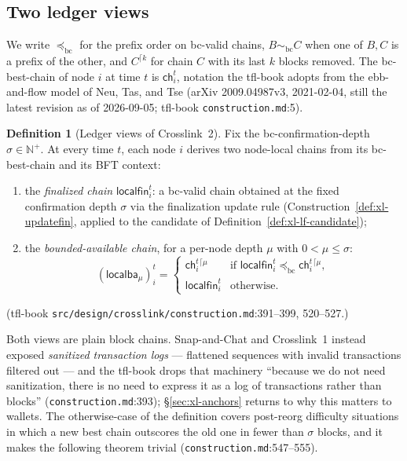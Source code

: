 \documentclass[11pt,a4paper]{article}
\theoremstyle{definition}
\newtheorem{definition}[theorem]{Definition}
\newcommand{\N}{\mathbb{N}}
\begin{document}
\subsection{Two ledger views}\label{sec:xl-views}

We write $\preceq_{\mathrm{bc}}$ for the prefix order on bc-valid chains,
$B \sim_{\mathrm{bc}} C$ when one of $B, C$ is a prefix of the other, and
$C^{\lceil k}$ for chain $C$ with its last $k$ blocks removed. The
bc-best-chain of node $i$ at time $t$ is $\mathsf{ch}_i^t$, notation the
tfl-book adopts from the ebb-and-flow model of Neu, Tas, and Tse (arXiv
2009.04987v3, 2021-02-04, still the latest revision as of 2026-09-05;
tfl-book \texttt{construction.md}:5).

\begin{definition}[Ledger views of Crosslink~2]\label{def:xl-ledger-views}
Fix the bc-confirmation-depth $\sigma \in \N^{+}$. At every time $t$, each
node $i$ derives two node-local chains from its bc-best-chain and its BFT
context:
\begin{enumerate}[label=(\roman*)]
\item the \emph{finalized chain} $\mathsf{localfin}_i^t$: a bc-valid chain
  obtained at the fixed confirmation depth $\sigma$ via the finalization
  update rule (Construction~\ref{def:xl-updatefin}, applied to the
  candidate of Definition~\ref{def:xl-lf-candidate});
\item the \emph{bounded-available chain}, for a per-node depth $\mu$ with
  $0 < \mu \le \sigma$:
  \[
    (\mathsf{localba}_{\mu})_i^t =
    \begin{cases}
      \mathsf{ch}_i^t{}^{\lceil\mu}
        & \text{if } \mathsf{localfin}_i^t \preceq_{\mathrm{bc}}
          \mathsf{ch}_i^t{}^{\lceil\mu},\\[2pt]
      \mathsf{localfin}_i^t & \text{otherwise.}
    \end{cases}
  \]
\end{enumerate}
(tfl-book \texttt{src/design/crosslink/construction.md}:391--399,
520--527.)
\end{definition}

Both views are plain block chains. Snap-and-Chat and Crosslink~1 instead
exposed \emph{sanitized transaction logs} --- flattened sequences with
invalid transactions filtered out --- and the tfl-book drops that machinery
``because we do not need sanitization, there is no need to express it as
a log of transactions rather than blocks''
(\texttt{construction.md}:393);
\S\ref{sec:xl-anchors} returns to why this matters to wallets. The
otherwise-case of the definition covers post-reorg difficulty situations in
which a new best chain outscores the old one in fewer than $\sigma$ blocks,
and it makes the following theorem trivial
(\texttt{construction.md}:547--555).
\end{document}
